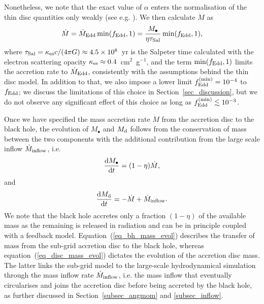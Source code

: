 \documentclass[a4paper,fleqn,usenatbib]{mnras}
\begin{document}
Nonetheless, we note that the exact value of $\alpha$ enters the normalisation of the thin disc quantities only weakly (see e.g. \citealt{frank+02}).
We then calculate $\dot{M}$ as
\begin{equation}
\dot{M} = \dot{M}_{\rm Edd} \min(f_{\rm Edd}, 1) = \frac{M_{\bullet}}{\eta \tau_{\rm Sal}} \min(f_{\rm Edd}, 1),
\end{equation}
where $\tau_{\rm Sal} = \kappa_{\rm es} c / (4 \pi G) \approx 4.5 \times 10^{8}$~yr is the Salpeter time calculated with the electron scattering opacity $\kappa_{\rm es} \approx 0.4$~cm$^{2}$~g$^{-1}$, and the term $\min(f_{\rm Edd}, 1)$ limits the accretion rate to $\dot{M}_{\rm Edd}$, consistently with the assumptions behind the thin disc model.
In addition to that, we also impose a lower limit $f_{\rm Edd}^{\rm (min)} = 10^{-4}$ to $f_{\rm Edd}$; we discuss the limitations of this choice in Section~\ref{sec_discussion}, but we do not observe any significant effect of this choice as long as $f_{\rm Edd}^{\rm (min)} \lesssim 10^{-3}$.

Once we have specified the mass accretion rate $\dot{M}$ from the accretion disc to the black hole, the evolution of $M_{\bullet}$ and $M_{\rm d}$ follows from the conservation of mass between the two components with the additional contribution from the large scale inflow $\dot{M}_{\rm inflow}$, i.e.
\begin{equation}\label{eq_bh_mass_evol}
\frac{{\rm d} M_{\bullet}}{{\rm d}t} = (1 - \eta) \dot{M},
\end{equation}
and
\begin{equation}\label{eq_disc_mass_evol}
\frac{{\rm d} M_{\rm d}}{{\rm d}t} = -\dot{M} + \dot{M}_{\rm inflow}.
\end{equation}
We note that the black hole accretes only a fraction $(1 - \eta)$ of the available mass as the remaining is released in radiation and can be in principle coupled with a feedback model.
Equation~(\ref{eq_bh_mass_evol}) describes the transfer of mass from the sub-grid accretion disc to the black hole, whereas equation~(\ref{eq_disc_mass_evol}) dictates the evolution of the accretion disc mass.
The latter links the sub-grid model to the large-scale hydrodynamical simulation through the mass inflow rate $\dot{M}_{\rm inflow}$, i.e. the mass inflow that eventually circularises and joins the accretion disc before being accreted by the black hole, as further discussed in Section~\ref{subsec_angmom} and \ref{subsec_inflow}.
\end{document}
